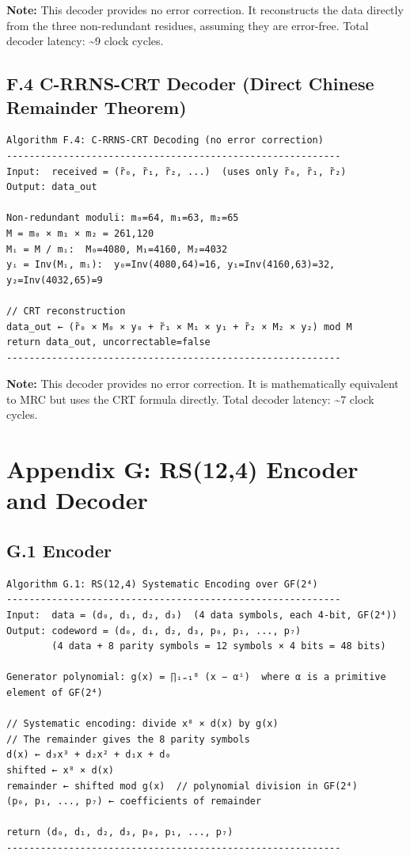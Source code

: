 \documentclass[
  12pt,
  a4paper]{report}
\begin{document}
\textbf{Note:} This decoder provides no error correction. It
reconstructs the data directly from the three non-redundant residues,
assuming they are error-free. Total decoder latency: \textasciitilde9
clock cycles.

\subsection{F.4 C-RRNS-CRT Decoder (Direct Chinese Remainder
Theorem)}\label{f.4-c-rrns-crt-decoder-direct-chinese-remainder-theorem}

\begin{verbatim}
Algorithm F.4: C-RRNS-CRT Decoding (no error correction)
-----------------------------------------------------------
Input:  received = (r̃₀, r̃₁, r̃₂, ...)  (uses only r̃₀, r̃₁, r̃₂)
Output: data_out

Non-redundant moduli: m₀=64, m₁=63, m₂=65
M = m₀ × m₁ × m₂ = 261,120
Mᵢ = M / mᵢ:  M₀=4080, M₁=4160, M₂=4032
yᵢ = Inv(Mᵢ, mᵢ):  y₀=Inv(4080,64)=16, y₁=Inv(4160,63)=32, y₂=Inv(4032,65)=9

// CRT reconstruction
data_out ← (r̃₀ × M₀ × y₀ + r̃₁ × M₁ × y₁ + r̃₂ × M₂ × y₂) mod M
return data_out, uncorrectable=false
-----------------------------------------------------------
\end{verbatim}

\textbf{Note:} This decoder provides no error correction. It is
mathematically equivalent to MRC but uses the CRT formula directly.
Total decoder latency: \textasciitilde7 clock cycles.

\section{Appendix G: RS(12,4) Encoder and
Decoder}\label{appendix-g-rs124-encoder-and-decoder}

\subsection{G.1 Encoder}\label{g.1-encoder}

\begin{verbatim}
Algorithm G.1: RS(12,4) Systematic Encoding over GF(2⁴)
-----------------------------------------------------------
Input:  data = (d₀, d₁, d₂, d₃)  (4 data symbols, each 4-bit, GF(2⁴))
Output: codeword = (d₀, d₁, d₂, d₃, p₀, p₁, ..., p₇)
        (4 data + 8 parity symbols = 12 symbols × 4 bits = 48 bits)

Generator polynomial: g(x) = ∏ᵢ₌₁⁸ (x − αⁱ)  where α is a primitive element of GF(2⁴)

// Systematic encoding: divide x⁸ × d(x) by g(x)
// The remainder gives the 8 parity symbols
d(x) ← d₃x³ + d₂x² + d₁x + d₀
shifted ← x⁸ × d(x)
remainder ← shifted mod g(x)  // polynomial division in GF(2⁴)
(p₀, p₁, ..., p₇) ← coefficients of remainder

return (d₀, d₁, d₂, d₃, p₀, p₁, ..., p₇)
-----------------------------------------------------------
\end{verbatim}
\end{document}
